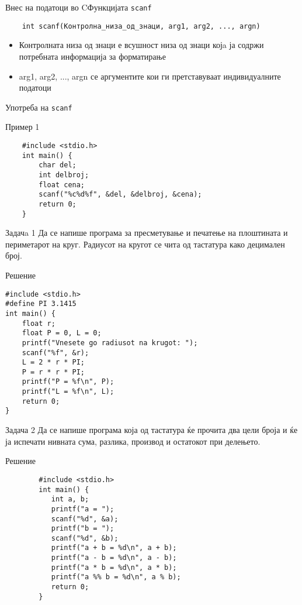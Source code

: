 \begin{frame}[fragile]{Внес на податоци во C}{Функцијата \texttt{scanf}}
	\begin{verbatim}
	int scanf(Контролна_низа_од_знаци, arg1, arg2, ..., argn)	
	\end{verbatim}	
	\begin{itemize}
	\item Контролната низа од знаци е всушност низа од знаци којa ја содржи потребната информација за форматирање	
	\item arg1, arg2, ..., argn се аргументите кои ги претставуваат индивидуалните податоци
	\end{itemize}	 
\end{frame}

\begin{frame}[fragile]{Употреба на \texttt{scanf}}

	\begin{exampleblock}{Пример 1}
	\begin{lstlisting}
	#include <stdio.h>
	int main() {
	    char del;
	    int delbroj;
	    float cena;
	    scanf("%c%d%f", &del, &delbroj, &cena);
	    return 0;
	}
	\end{lstlisting}
	\end{exampleblock}

\end{frame}

\begin{frame}[fragile]{Задачa 1}
Да се напише програма за пресметување и печатење на плоштината и периметарот на круг. 
Радиусот на кругот се чита од тастатура како децимален број.
\begin{exampleblock}{Решение}
	\begin{lstlisting}
#include <stdio.h>
#define PI 3.1415
int main() {
    float r;
    float P = 0, L = 0;
    printf("Vnesete go radiusot na krugot: ");
    scanf("%f", &r);
    L = 2 * r * PI;
    P = r * r * PI;
    printf("P = %f\n", P);
    printf("L = %f\n", L);
    return 0;
}
\end{lstlisting}
\end{exampleblock}
\end{frame}


\begin{frame}[fragile]{Задача 2}
Да се напише програма која од тастатура ќе прочита два цели броја и ќе ја испечати нивната сума, 
разлика, производ и остатокот при делењето.
	\begin{exampleblock}{Решение}
		\begin{lstlisting}
		#include <stdio.h>
		int main() {
		   int a, b;
		   printf("a = ");
		   scanf("%d", &a);
		   printf("b = ");
		   scanf("%d", &b);
		   printf("a + b = %d\n", a + b);
		   printf("a - b = %d\n", a - b);
		   printf("a * b = %d\n", a * b);
		   printf("a %% b = %d\n", a % b);
		   return 0;
		}
		\end{lstlisting}
	\end{exampleblock}
\end{frame}

